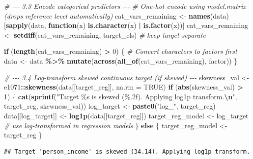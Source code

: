 \documentclass[
]{article}
\newenvironment{Shaded}{\begin{snugshade}}{\end{snugshade}}
\newcommand{\AttributeTok}[1]{\textcolor[rgb]{0.13,0.29,0.53}{#1}}
\newcommand{\CommentTok}[1]{\textcolor[rgb]{0.56,0.35,0.01}{\textit{#1}}}
\newcommand{\ConstantTok}[1]{\textcolor[rgb]{0.56,0.35,0.01}{#1}}
\newcommand{\ControlFlowTok}[1]{\textcolor[rgb]{0.13,0.29,0.53}{\textbf{#1}}}
\newcommand{\DecValTok}[1]{\textcolor[rgb]{0.00,0.00,0.81}{#1}}
\newcommand{\FunctionTok}[1]{\textcolor[rgb]{0.13,0.29,0.53}{\textbf{#1}}}
\newcommand{\NormalTok}[1]{#1}
\newcommand{\OtherTok}[1]{\textcolor[rgb]{0.56,0.35,0.01}{#1}}
\newcommand{\SpecialCharTok}[1]{\textcolor[rgb]{0.81,0.36,0.00}{\textbf{#1}}}
\newcommand{\StringTok}[1]{\textcolor[rgb]{0.31,0.60,0.02}{#1}}
\begin{document}
\begin{Shaded}
\begin{Highlighting}[]
\CommentTok{\# {-}{-}{-} 3.3  Encode categorical predictors {-}{-}{-}}
\CommentTok{\# One{-}hot encode using model.matrix (drops reference level automatically)}
\NormalTok{cat\_vars\_remaining }\OtherTok{\textless{}{-}} \FunctionTok{names}\NormalTok{(data)[}\FunctionTok{sapply}\NormalTok{(data, }\ControlFlowTok{function}\NormalTok{(x) }\FunctionTok{is.character}\NormalTok{(x) }\SpecialCharTok{|} \FunctionTok{is.factor}\NormalTok{(x))]}
\NormalTok{cat\_vars\_remaining }\OtherTok{\textless{}{-}} \FunctionTok{setdiff}\NormalTok{(cat\_vars\_remaining, target\_cls)  }\CommentTok{\# keep target separate}

\ControlFlowTok{if}\NormalTok{ (}\FunctionTok{length}\NormalTok{(cat\_vars\_remaining) }\SpecialCharTok{\textgreater{}} \DecValTok{0}\NormalTok{) \{}
  \CommentTok{\# Convert characters to factors first}
\NormalTok{  data }\OtherTok{\textless{}{-}}\NormalTok{ data }\SpecialCharTok{\%\textgreater{}\%} \FunctionTok{mutate}\NormalTok{(}\FunctionTok{across}\NormalTok{(}\FunctionTok{all\_of}\NormalTok{(cat\_vars\_remaining), factor))}
\NormalTok{\}}

\CommentTok{\# {-}{-}{-} 3.4  Log{-}transform skewed continuous target (if skewed) {-}{-}{-}}
\NormalTok{skewness\_val }\OtherTok{\textless{}{-}}\NormalTok{ e1071}\SpecialCharTok{::}\FunctionTok{skewness}\NormalTok{(data[[target\_reg]], }\AttributeTok{na.rm =} \ConstantTok{TRUE}\NormalTok{)}
\ControlFlowTok{if}\NormalTok{ (}\FunctionTok{abs}\NormalTok{(skewness\_val) }\SpecialCharTok{\textgreater{}} \DecValTok{1}\NormalTok{) \{}
  \FunctionTok{cat}\NormalTok{(}\FunctionTok{sprintf}\NormalTok{(}\StringTok{"Target \textquotesingle{}\%s\textquotesingle{} is skewed (\%.2f). Applying log1p transform.}\SpecialCharTok{\textbackslash{}n}\StringTok{"}\NormalTok{,}
\NormalTok{              target\_reg, skewness\_val))}
\NormalTok{  log\_target }\OtherTok{\textless{}{-}} \FunctionTok{paste0}\NormalTok{(}\StringTok{"log\_"}\NormalTok{, target\_reg)}
\NormalTok{  data[[log\_target]] }\OtherTok{\textless{}{-}} \FunctionTok{log1p}\NormalTok{(data[[target\_reg]])}
\NormalTok{  target\_reg\_model }\OtherTok{\textless{}{-}}\NormalTok{ log\_target          }\CommentTok{\# use log{-}transformed in regression models}
\NormalTok{\} }\ControlFlowTok{else}\NormalTok{ \{}
\NormalTok{  target\_reg\_model }\OtherTok{\textless{}{-}}\NormalTok{ target\_reg}
\NormalTok{\}}
\end{Highlighting}
\end{Shaded}

\begin{verbatim}
## Target 'person_income' is skewed (34.14). Applying log1p transform.
\end{verbatim}
\end{document}
